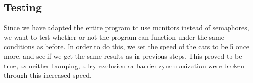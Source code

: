 \subsection{Testing}
Since we have adapted the entire program to use monitors instead of semaphores, we want to test whether or not the program can function under the same conditions as before. In order to do this, we set the speed of the cars to be 5 once more, and see if we get the same results as in previous steps. This proved to be true, as neither bumping, alley exclusion or barrier synchronization were broken through this increased speed. 